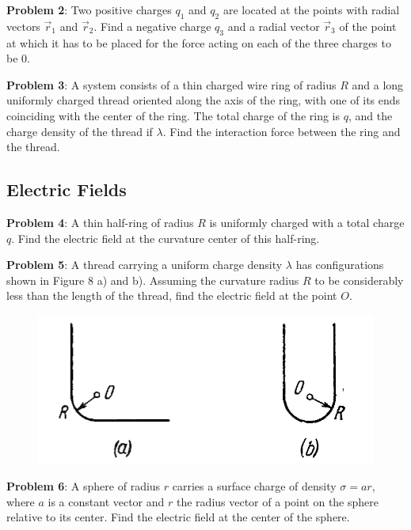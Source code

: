 \documentclass[11pt, letterpaper]{article}
\begin{document}
\textbf{Problem 2}: Two positive charges $q_1$ and $q_2$ are located at the points
with radial vectors $\vec{r}_1$ and $\vec{r}_2$. Find a negative charge $q_3$ and a radial 
vector $\vec{r}_3$ of the point at which it has to be placed for the force acting on each of 
the three charges to be $0$.

\textbf{Problem 3}: A system consists of a thin charged wire ring of radius $R$ and a long
uniformly charged thread oriented along the axis of the ring, with one of its ends coinciding 
with the center of the ring. The total charge of the ring is $q$, and the charge density of the
thread if $\lambda$. Find the interaction force between the ring and the thread.

\subsection{Electric Fields}
\textbf{Problem 4}: A thin half-ring of radius $R$ is uniformly charged with a total charge $q$. 
Find the electric field at the curvature center of this half-ring.

\textbf{Problem 5}: A thread carrying a uniform charge density $\lambda$ has configurations 
shown in Figure 8 a) and b). Assuming the curvature radius $R$ to be considerably less than
the length of the thread, find the electric field at the point $O$.
\begin{figure}[h!]
	\centering
	\includegraphics[scale=0.6]{irodov_3-15}
\end{figure}

\textbf{Problem 6}: A sphere of radius $r$ carries a surface charge of density $\sigma=ar$,
where $a$ is a constant vector and $r$ the radius vector of a point on the sphere relative to 
its center. Find the electric field at the center of the sphere.
\end{document}

